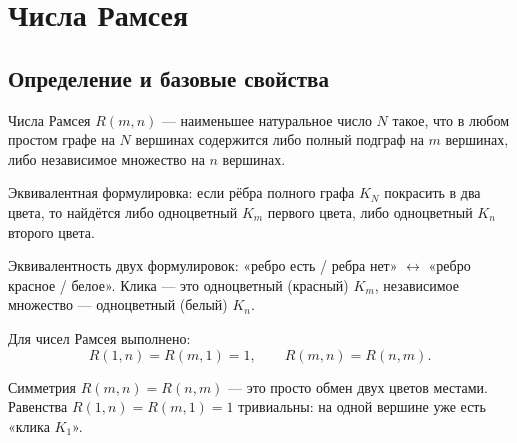 
\section{Числа Рамсея}

\subsection{Определение и базовые свойства}

\begin{Definition}{Числа Рамсея}{}
	$R(m,n)$ — наименьшее натуральное число $N$ такое, что в любом простом графе на $N$
	вершинах содержится либо полный подграф на $m$ вершинах, либо независимое множество
	на $n$ вершинах.

	Эквивалентная формулировка: если рёбра полного графа $K_N$ покрасить в два цвета,
	то найдётся либо одноцветный $K_m$ первого цвета, либо одноцветный $K_n$ второго цвета.
\end{Definition}

\begin{Remark}{}{}
	Эквивалентность двух формулировок: «ребро есть / ребра нет» $\leftrightarrow$ «ребро красное / белое». Клика — это одноцветный (красный) $K_m$, независимое множество — одноцветный (белый) $K_n$.
\end{Remark}

\begin{Proposition}{}{}
	Для чисел Рамсея выполнено:
	\[
	R(1,n)=R(m,1)=1,
	\qquad
	R(m,n)=R(n,m).
	\]
\end{Proposition}

\begin{Remark}{}{}
	Симметрия $R(m,n)=R(n,m)$ — это просто обмен двух цветов местами. Равенства $R(1,n)=R(m,1)=1$ тривиальны: на одной вершине уже есть «клика $K_1$».
\end{Remark}

